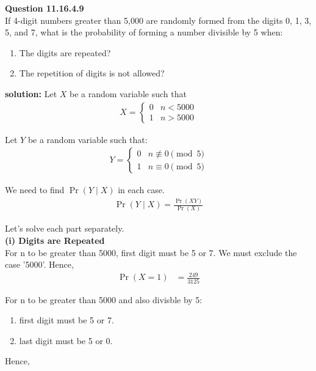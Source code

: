 \documentclass{article}
\begin{document}
\providecommand{\pr}[1]{\ensuremath{\Pr\left(#1\right)}}
\providecommand{\brak}[1]{\ensuremath{\left(#1\right)}}
\newcommand{\solution}{\noindent \textbf{solution: }}

\textbf{Question 11.16.4.9}\\
If 4-digit numbers greater than 5,000 are randomly formed from the digits 0, 1, 3, 5, and 7, what is the probability of forming a number divisible by 5 when:
\begin{enumerate}
    \item The digits are repeated?
    \item The repetition of digits is not allowed?
\end{enumerate}

\solution
Let $X$ be a random variable such that 
\begin{align}
	X = \begin{cases}
		0 &  n<5000\\
		1 &  n>5000\end{cases}
\end{align}

Let $Y$ be a random variable such that:
\begin{align}
	Y = \begin{cases}
		0 & n \not\equiv 0 \pmod{5}\\
		1 & n \equiv 0 \pmod{5}\end{cases}
\end{align}

We need to find \pr{Y \mid X} in each case. \\

\begin{align}
	\pr{Y \mid X}=\frac{\pr{XY} }{\pr{X}}
\end{align}

Let's solve each part separately. \\

\textbf{(i) Digits are Repeated}\\

For n to be greater than 5000, first digit must be 5 or 7. We must exclude the case '5000'. Hence,
\begin{align}
	\pr{X=1} &=\frac{249}{3125}
\end{align}

For n to be greater than 5000 and also divisble by 5:
\begin{enumerate}
\item first digit must be 5 or 7.
\item last digit must be 5 or 0.
\end{enumerate}
Hence,
\end{document}
